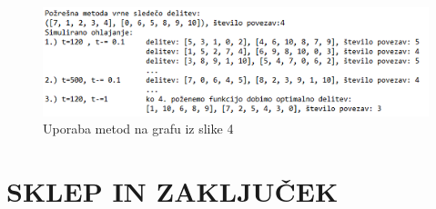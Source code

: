 \documentclass[12pt,a4paper]{amsart}
\theoremstyle{definition} %
\theoremstyle{plain} %
\begin{document}
\begin{figure}
  \centering
  \includegraphics{graf_metode}
 \caption{Uporaba metod na grafu iz slike 4}
\end{figure}
\FloatBarrier

\section{\textbf{SKLEP IN ZAKLJUČEK}}
\end{document}

